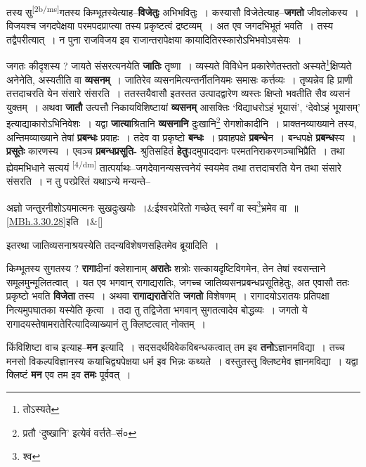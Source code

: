\documentclass[article,12pt,a4paper]{memoir}
\begin{document}
	  \pstart तस्य सु\leavevmode\textsuperscript{\rmlatinfont\tiny [2b/ms]}गतस्य किम्भूतस्येत्याह--\textbf{विजेतुः} अभिभवितुः । कस्यासौ विजेतेत्याह--\textbf{जगतो} जीवलोकस्य । विजयश्च जगदपेक्षया परमपदप्राप्त्या तस्य प्रकृष्टत्वं द्रष्टव्यम् । अत एव जगदभिभूतं भवति । तस्य तद्वैपरीत्यात् । न पुना राजविजय इव राजान्तरापेक्षया कायादितिरस्कारोऽभिभवोऽवसेयः ।
	\pend
      

	  \pstart जगतः कीदृशस्य ? जायते संसरत्यनयेति \textbf{जातिः} तृष्णा । व्यस्यते विविधेन प्रकारेणेतस्ततो अस्यते\footnote{तोऽस्यते}क्षिप्यते अनेनेति, अस्यतीति वा \textbf{व्यसनम्} । जातिरेव व्यसनमित्यन्तर्नीतनियमः समासः कर्त्तव्यः । तृष्यन्नेव हि प्राणी तत्तदाचरति येन संसारे संसरति । ततस्तयैवासौ इतस्तत उत्पादद्वारेण व्यस्तः क्षिप्तो भवतीति सैव व्यसनं युक्तम् । अथवा \textbf{जातौ} उत्पत्तौ निकायविशिष्टायां \textbf{व्यसनम्} आसक्तिः ‘विद्याधरोऽहं भूयासं’, ‘देवोऽहं भूयासम्’ इत्याद्याकारोऽभिनिवेशः । यद्वा \textbf{जात्या}श्रितानि \textbf{व्यसनानि} दुःखानि\footnote{प्रतौ ‘दुष्खानि’ इत्येवं वर्त्तते--सं०} रोगशोकादीनि । प्राक्तनव्याख्याने तस्य, अन्तिमव्याख्याने तेषां \textbf{प्रबन्धः} प्रवाहः । तदेव वा प्रकृष्टो \textbf{बन्धः} । प्रवाहपक्षे \textbf{प्रबन्धे}न । बन्धपक्षे \textbf{प्रबन्ध}स्य । \textbf{प्रसूतेः} कारणस्य । एवञ्च \textbf{प्रबन्धप्रसूति-} श्रुतिसहितं \textbf{हेतु}पदमुपाददानः परमतनिराकरणञ्चाभिप्रैति । तथा ह्येवमभिधाने सत्ययं \leavevmode\textsuperscript{\rmlatinfont\tiny [4/dm]} तात्पर्याथः--जगदेवानन्यसत्त्वनेयं स्वयमेव तथा तत्तदाचरति येन तथा संसारे संसरति । न तु परप्रेरितं यथाऽन्ये मन्यन्ते--
	\pend
      
	    
	    \stanza[\smallbreak]
अज्ञो जन्तुरनीशोऽयमात्मनः सुखदुःखयोः ।&ईश्वरप्रेरितो गच्छेत् स्वर्गं वा स्व\footnote{श्व}भ्रमेव वा ॥ \cref{MBh.3.30.28}इति ।\&[\smallbreak]


	

	  \pstart इतरथा जातिव्यसनाश्रयस्येति तदन्यविशेषणसहितमेव ब्रूयादिति ।
	\pend
      

	  \pstart किम्भूतस्य सुगतस्य ? \textbf{रागा}दीनां क्लेशानाम् \textbf{अरातेः} शत्रोः सत्कायदृष्टिविगमेन, तेन तेषां स्वसन्ताने समूलमुन्मूलितत्वात् । यत एव भगवान् रागाद्यरातिः, जगच्च जातिव्यसनप्रबन्धप्रसूतिहेतुः, अत एवासौ ततः प्रकृष्टो भवति \textbf{विजेता} तस्य । अथवा \textbf{रागाद्यराते}रिति \textbf{जगतो} विशेषणम् । रागादयोऽरातयः प्रतिपक्षा नित्यमुपघातका यस्येति कृत्वा । तदा तु तद्विजेता भगवान् सुगतत्वादेव बोद्धव्यः । जगतो ये रागादयस्तेषामरातेरित्यादिव्याख्यानं तु क्लिष्टत्वात् नोक्तम् ।
	\pend
      

	  \pstart किंविशिष्टा वाच इत्याह--\textbf{मन} इत्यादि । सदसदर्थविवेकविबन्धकत्वात् तम इव \textbf{तनो}ऽज्ञानमविद्या । तच्च मनसो विकल्पविज्ञानस्य कयाचिद्व्यपेक्षया धर्म इव भिन्नः कथ्यते । वस्तुतस्तु क्लिष्टमेव ज्ञानमविद्या । यद्वा क्लिष्टं \textbf{मन} एव तम इव \textbf{तमः} पूर्ववत् ।
	\pend
      
\end{document}
